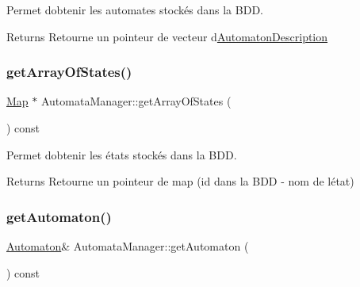 Permet d\textquotesingle{}obtenir les automates stockés dans la B\+DD. 

\begin{DoxyReturn}{Returns}
Retourne un pointeur de vecteur d\textquotesingle{}\mbox{\hyperlink{class_automata_manager_1_1_automaton_description}{Automaton\+Description}} 
\end{DoxyReturn}
\mbox{\label{class_automata_manager_adda0cd11e599066e2c17e12d0025ff86}} 
\subsubsection{\texorpdfstring{get\+Array\+Of\+States()}{getArrayOfStates()}}
{\footnotesize\ttfamily \mbox{\hyperlink{automatamanager_8h_a83622686c79f1453f6971e58d371a481}{Map}} $\ast$ Automata\+Manager\+::get\+Array\+Of\+States (\begin{DoxyParamCaption}{ }\end{DoxyParamCaption}) const}



Permet d\textquotesingle{}obtenir les états stockés dans la B\+DD. 

\begin{DoxyReturn}{Returns}
Retourne un pointeur de map (id dans la B\+DD -\/ nom de l\textquotesingle{}état) 
\end{DoxyReturn}
\mbox{\label{class_automata_manager_a2b33d81658dc1daada4e814775cd444f}} 
\subsubsection{\texorpdfstring{get\+Automaton()}{getAutomaton()}}
{\footnotesize\ttfamily \mbox{\hyperlink{class_automaton}{Automaton}}\& Automata\+Manager\+::get\+Automaton (\begin{DoxyParamCaption}{ }\end{DoxyParamCaption}) const\hspace{0.3cm}{\ttfamily [inline]}}

\mbox{\label{class_automata_manager_a655cc3cb08c8548799ce7b5176bbb262}} 
